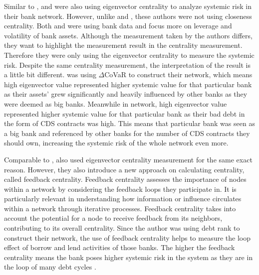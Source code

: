 \documentclass[a4paper,11pt]{article}
\begin{document}
Similar to \cite{Zhang_Yin_Sha_2023}, \cite{Duan_El_Ghoul_Guedhami_Li_Li_2020} and \cite{Markose_Giansante_Shaghaghi_2012} were also using eigenvector centrality to analyze systemic risk in their bank network. However, unlike \cite{Zhang_Yin_Sha_2023} and \cite{Lai_Hu_2021}, these authors were not using closeness centrality. Both \cite{Duan_El_Ghoul_Guedhami_Li_Li_2020} and \cite{Markose_Giansante_Shaghaghi_2012} were using bank data and focus more on leverage and volatility of bank assets. Although the measurement taken by the authors differs, they want to highlight the measurement result in the centrality measurement. Therefore they were only using the eigenvector centrality to measure the systemic risk. Despite the same centrality measurement, the interpretation of the result is a little bit different. \cite{Duan_El_Ghoul_Guedhami_Li_Li_2020} was using $\Delta$CoVaR to construct their network, which means high eigenvector value represented higher systemic value for that particular bank as their assets’ grew significantly and heavily influenced by other banks as they were deemed as big banks. Meanwhile in \cite{Markose_Giansante_Shaghaghi_2012} network, high eigenvector value represented higher systemic value for that particular bank as their bad debt in the form of CDS contracts was high. This means that particular bank was seen as a big bank and referenced by other banks for the number of CDS contracts they should own, increasing the systemic risk of the whole network even more.

Comparable to \cite{Markose_Giansante_Shaghaghi_2012}, \cite{Battiston_Puliga_Kaushik_Tasca_Caldarelli_2012} also used eigenvector centrality measurement for the same exact reason. However, they  also introduce a new approach on calculating centrality, called feedback centrality. Feedback centrality assesses the importance of nodes within a network by considering the feedback loops they participate in. It is particularly relevant in understanding how information or influence circulates within a network through iterative processes. Feedback centrality takes into account the potential for a node to receive feedback from its neighbors, contributing to its overall centrality. Since the author was using debt rank to construct their network, the use of feedback centrality helps to measure the loop effect of borrow and lend activities of those banks. The higher the feedback centrality means the bank poses higher systemic risk in the system as they are in the loop of many debt cycles \citep{Battiston_Puliga_Kaushik_Tasca_Caldarelli_2012}.
\end{document}
